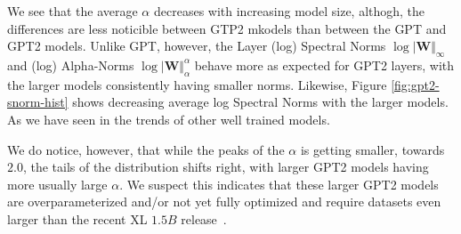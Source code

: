 We see that the average $\alpha$ decreases with increasing model size,
althogh, the differences are less noticible between GTP2 mkodels than between the GPT and GPT2 models.
Unlike GPT, however, the Layer (log) Spectral Norms $\log\vert\mathbf{W}\Vert_{\infty}$ 
and (log) Alpha-Norms $\log\vert\mathbf{W}\Vert_{\alpha}^{\alpha}$
behave more as expected for GPT2 layers, with the larger models  consistently having  smaller norms. 
Likewise, Figure \ref{fig:gpt2-snorm-hist} shows decreasing average log Spectral Norms
with the larger models.   As we have seen in the trends of other well trained models.

We do notice, however, that while the peaks of the $\alpha$ is getting smaller, towards $2.0$,
the tails of the distribution shifts right, with larger GPT2 models having more
usually large $\alpha$.  We suspect this indicates that these larger GPT2 models are 
overparameterized and/or not yet fully optimized and require datasets even larger
than the recent XL $1.5B$ release~\cite{gpt2-xl}.

